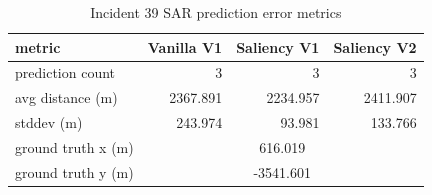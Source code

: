 \begin{table}[ht]
\centering
\caption{Incident 39 SAR prediction error metrics}
\label{tab:sar-incident-39}
\begin{tabular}{lrrr}
\hline
metric & Vanilla V1 & Saliency V1 & Saliency V2 \\
\hline
prediction count & 3 & 3 & 3 \\
avg distance (m) & 2367.891 & 2234.957 & 2411.907 \\
stddev (m) & 243.974 & 93.981 & 133.766 \\
ground truth x (m) & \multicolumn{3}{c}{616.019} \\
ground truth y (m) & \multicolumn{3}{c}{-3541.601} \\
\hline
\end{tabular}
\end{table}
